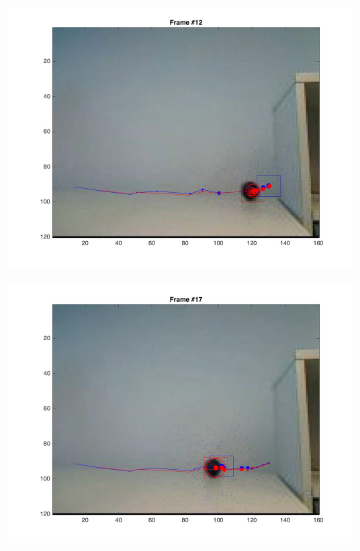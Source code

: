 \documentclass{ethz_report}
\begin{document}
\begin{figure}[h]
\begin{subfigure}[b]{.25\textwidth}
        \includegraphics[width=1\linewidth]{images/video3_particles_high_11}
    \end{subfigure}%
    \begin{subfigure}[b]{.25\textwidth}
        \centering
        \includegraphics[width=1\linewidth]{images/video3_particles_high_16}
    \end{subfigure}
    \begin{subfigure}[b]{.25\textwidth}
        \centering

\end{subfigure}
\end{figure}
\end{document}
